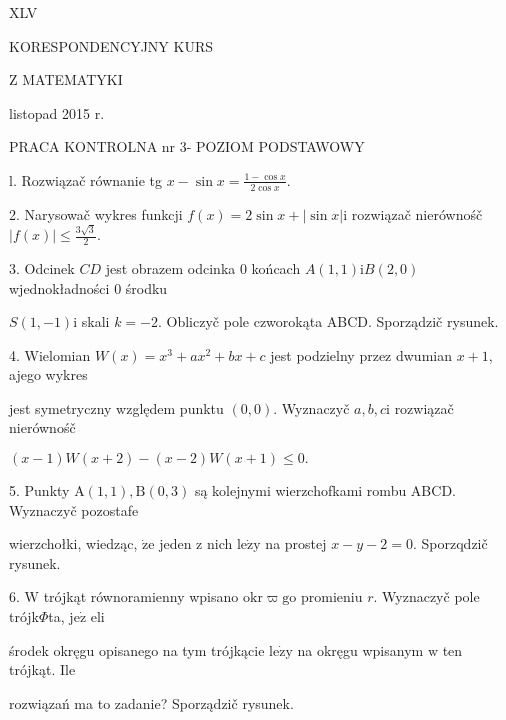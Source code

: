 \documentclass[a4paper,12pt]{article}
\begin{document}
XLV

KORESPONDENCYJNY KURS

Z MATEMATYKI

listopad 2015 r.

PRACA KONTROLNA nr 3- POZIOM PODSTAWOWY

l. Rozwiązač równanie tg $x-\displaystyle \sin x=\frac{1-\cos x}{2\cos x}.$

2. Narysowač wykres funkcji $f(x)=2\sin x+|\sin x|\mathrm{i}$ rozwiązač nierównośč $|f(x)|\displaystyle \leq\frac{3\sqrt{3}}{2}.$

3. Odcinek $CD$ jest obrazem odcinka $0$ końcach $A(1,1)\mathrm{i}B(2,0)$ wjednokładności $0$ środku

$S(1,-1)\mathrm{i}$ skali $k=-2$. Obliczyč pole czworokąta ABCD. Sporządzič rysunek.

4. Wielomian $W(x)=x^{3}+ax^{2}+bx+c$ jest podzielny przez dwumian $x+1$, ajego wykres

jest symetryczny względem punktu $(0,0)$. Wyznaczyč $a, b, c\mathrm{i}$ rozwiązač nierównośč

$(x-1)W(x+2)-(x-2)W(x+1)\leq 0.$

5. Punkty $\mathrm{A}(1,1), \mathrm{B}(0,3)$ są kolejnymi wierzchofkami rombu ABCD. Wyznaczyč pozostafe

wierzchołki, wiedząc, $\dot{\mathrm{z}}\mathrm{e}$ jeden $\mathrm{z}$ nich $\mathrm{l}\mathrm{e}\dot{\mathrm{z}}\mathrm{y}$ na prostej $x-y-2=0$. Sporzqdzič rysunek.

6. $\mathrm{W}$ trójkąt równoramienny wpisano $\mathrm{o}\mathrm{k}\mathrm{r}\varpi \mathrm{g}\mathrm{o}$ promieniu $r$. Wyznaczyč pole trójk$\Phi$ta, $\mathrm{j}\mathrm{e}\dot{\mathrm{z}}$ eli

środek okręgu opisanego na tym trójkącie $\mathrm{l}\mathrm{e}\dot{\mathrm{z}}\mathrm{y}$ na okręgu wpisanym $\mathrm{w}$ ten trójkąt. Ile

rozwiązań ma to zadanie? Sporządzič rysunek.
\end{document}
